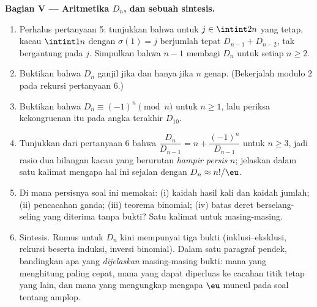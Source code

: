 \begin{problem}
\medskip
\noindent\textbf{Bagian V --- Aritmetika $D_n$, dan sebuah
sintesis.}
\begin{enumerate}[resume]
  \item Perhalus pertanyaan 5: tunjukkan bahwa untuk $j \in
        \intint2n$ yang tetap,  kacau $\intint1n$ dengan
        $\sigma(1) = j$ berjumlah tepat $D_{n-1} + D_{n-2}$,
        tak bergantung pada $j$. Simpulkan bahwa $n - 1$ membagi $D_n$
        untuk setiap $n \geq 2$.
  \item Buktikan bahwa $D_n$ ganjil jika dan hanya jika $n$ genap. (Bekerjalah
        modulo $2$ pada rekursi pertanyaan 6.)
  \item Buktikan bahwa $D_n \equiv (-1)^n \pmod n$ untuk $n \geq 1$, lalu
        periksa kekongruenan itu pada angka terakhir $D_{10}$.
  \item Tunjukkan dari pertanyaan 6 bahwa $\dfrac{D_n}{D_{n-1}} = n +
        \dfrac{(-1)^n}{D_{n-1}}$ untuk $n \geq 3$, jadi rasio dua
        bilangan  kacau yang berurutan \emph{hampir persis}
        $n$; jelaskan dalam satu kalimat mengapa hal ini sejalan dengan
        $D_n \approx n!/\eu$.
  \item Di mana persisnya soal ini memakai: (i) kaidah hasil kali dan
        kaidah jumlah; (ii) pencacahan ganda; (iii) teorema binomial;
        (iv) batas deret berselang-seling yang diterima tanpa bukti? Satu
        kalimat untuk masing-masing.
  \item Sintesis. Rumus untuk $D_n$ kini mempunyai tiga bukti
        (inklusi--eksklusi, rekursi beserta induksi, inversi
        binomial). Dalam satu paragraf pendek, bandingkan apa yang
        \emph{dijelaskan} masing-masing bukti: mana yang menghitung paling
        cepat, mana yang dapat diperluas ke cacahan titik tetap yang lain,
        dan mana yang mengungkap mengapa $\eu$ muncul pada soal tentang amplop.

\end{enumerate}
\end{problem}

